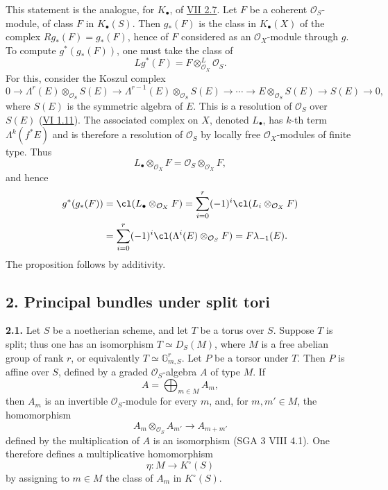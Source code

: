 This statement is the analogue, for $K_\bullet$, of \hyperlink{sga6.e07.para.2-6}{VII 2.7}. Let $F$ be a coherent $\mathcal O_S$-module, of class $F$ in $K_\bullet(S)$. Then $g_*(F)$ is the class in $K_\bullet(X)$ of the complex $Rg_*(F)=g_*(F)$, hence of $F$ considered as an $\mathcal O_X$-module through $g$. To compute $g^*(g_*(F))$, one must take the class of
\[
 Lg^*(F)=F\otimes^L_{\mathcal O_X}\mathcal O_S.
\]
For this, consider the Koszul complex
\[
0\longrightarrow \Lambda^r(E)\otimes_{\mathcal O_S}S(E)\longrightarrow
\Lambda^{r-1}(E)\otimes_{\mathcal O_S}S(E)\longrightarrow \cdots\longrightarrow
E\otimes_{\mathcal O_S}S(E)\longrightarrow S(E)\longrightarrow 0,
\]
where $S(E)$ is the symmetric algebra of $E$. This is a resolution of $\mathcal O_S$ over $S(E)$ (\hyperlink{sga6.e06.sec.1.10}{VI 1.11}). The associated complex on $X$, denoted $L_\bullet$, has $k$-th term $\Lambda^k(f^*E)$ and is therefore a resolution of $\mathcal O_S$ by locally free $\mathcal O_X$-modules of finite type. Thus
\[
 L_\bullet\otimes_{\mathcal O_X}F=\mathcal O_S\otimes_{\mathcal O_X}F,
\]
and hence
\[
\begin{aligned}
 g^*(g_*(F))
 &=\cl(L_\bullet\otimes_{\mathcal O_X}F)
   =\sum_{i=0}^r(-1)^i\cl(L_i\otimes_{\mathcal O_X}F)\\
 &=\sum_{i=0}^r(-1)^i\cl(\Lambda^i(E)\otimes_{\mathcal O_S}F)
   =F\lambda_{-1}(E).
\end{aligned}
\]
The proposition follows by additivity.

\subsection*{2. Principal bundles under split tori}

\textbf{2.1.} Let $S$ be a noetherian scheme, and let $T$ be a torus over $S$. Suppose $T$ is split; thus one has an isomorphism $T\simeq D_S(M)$, where $M$ is a free abelian group of rank $r$, or equivalently $T\simeq \mathbb G_{m,S}^r$. Let $P$ be a torsor under $T$. Then $P$ is affine over $S$, defined by a graded $\mathcal O_S$-algebra $A$ of type $M$. If
\[
 A=\bigoplus_{m\in M}A_m,
\]
then $A_m$ is an invertible $\mathcal O_S$-module for every $m$, and, for $m,m'\in M$, the homomorphism
\[
 A_m\otimes_{\mathcal O_S}A_{m'}\longrightarrow A_{m+m'}
\]
defined by the multiplication of $A$ is an isomorphism (SGA 3 VIII 4.1). One therefore defines a multiplicative homomorphism
\[
 \eta:M\longrightarrow K^\circ(S)
\]
by assigning to $m\in M$ the class of $A_m$ in $K^\circ(S)$.

